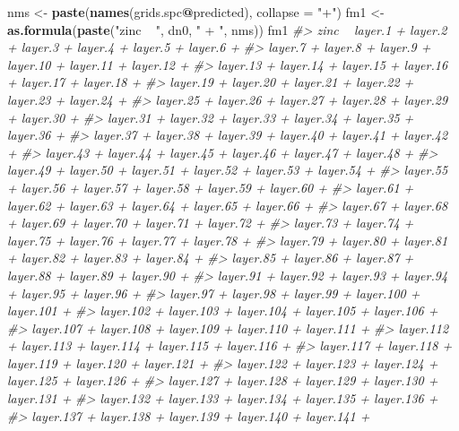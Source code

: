 \documentclass[graybox,natbib,nospthms,UStrade]{svmono}
\newenvironment{Shaded}{\begin{snugshade}}{\end{snugshade}}
\newcommand{\CommentTok}[1]{\textcolor[rgb]{0.37,0.37,0.37}{\textit{#1}}}
\newcommand{\DataTypeTok}[1]{\textcolor[rgb]{0.27,0.27,0.27}{#1}}
\newcommand{\KeywordTok}[1]{\textcolor[rgb]{0.27,0.27,0.27}{\textbf{#1}}}
\newcommand{\NormalTok}[1]{#1}
\newcommand{\OperatorTok}[1]{\textcolor[rgb]{0.43,0.43,0.43}{\textbf{#1}}}
\newcommand{\StringTok}[1]{\textcolor[rgb]{0.5,0.5,0.5}{#1}}
\begin{document}
\begin{Shaded}
\begin{Highlighting}[]
\NormalTok{nms <-}\StringTok{ }\KeywordTok{paste}\NormalTok{(}\KeywordTok{names}\NormalTok{(grids.spc}\OperatorTok{@}\NormalTok{predicted), }\DataTypeTok{collapse =} \StringTok{"+"}\NormalTok{)}
\NormalTok{fm1 <-}\StringTok{ }\KeywordTok{as.formula}\NormalTok{(}\KeywordTok{paste}\NormalTok{(}\StringTok{"zinc ~ "}\NormalTok{, dn0, }\StringTok{" + "}\NormalTok{, nms))}
\NormalTok{fm1}
\CommentTok{#> zinc ~ layer.1 + layer.2 + layer.3 + layer.4 + layer.5 + layer.6 + }
\CommentTok{#>     layer.7 + layer.8 + layer.9 + layer.10 + layer.11 + layer.12 + }
\CommentTok{#>     layer.13 + layer.14 + layer.15 + layer.16 + layer.17 + layer.18 + }
\CommentTok{#>     layer.19 + layer.20 + layer.21 + layer.22 + layer.23 + layer.24 + }
\CommentTok{#>     layer.25 + layer.26 + layer.27 + layer.28 + layer.29 + layer.30 + }
\CommentTok{#>     layer.31 + layer.32 + layer.33 + layer.34 + layer.35 + layer.36 + }
\CommentTok{#>     layer.37 + layer.38 + layer.39 + layer.40 + layer.41 + layer.42 + }
\CommentTok{#>     layer.43 + layer.44 + layer.45 + layer.46 + layer.47 + layer.48 + }
\CommentTok{#>     layer.49 + layer.50 + layer.51 + layer.52 + layer.53 + layer.54 + }
\CommentTok{#>     layer.55 + layer.56 + layer.57 + layer.58 + layer.59 + layer.60 + }
\CommentTok{#>     layer.61 + layer.62 + layer.63 + layer.64 + layer.65 + layer.66 + }
\CommentTok{#>     layer.67 + layer.68 + layer.69 + layer.70 + layer.71 + layer.72 + }
\CommentTok{#>     layer.73 + layer.74 + layer.75 + layer.76 + layer.77 + layer.78 + }
\CommentTok{#>     layer.79 + layer.80 + layer.81 + layer.82 + layer.83 + layer.84 + }
\CommentTok{#>     layer.85 + layer.86 + layer.87 + layer.88 + layer.89 + layer.90 + }
\CommentTok{#>     layer.91 + layer.92 + layer.93 + layer.94 + layer.95 + layer.96 + }
\CommentTok{#>     layer.97 + layer.98 + layer.99 + layer.100 + layer.101 + }
\CommentTok{#>     layer.102 + layer.103 + layer.104 + layer.105 + layer.106 + }
\CommentTok{#>     layer.107 + layer.108 + layer.109 + layer.110 + layer.111 + }
\CommentTok{#>     layer.112 + layer.113 + layer.114 + layer.115 + layer.116 + }
\CommentTok{#>     layer.117 + layer.118 + layer.119 + layer.120 + layer.121 + }
\CommentTok{#>     layer.122 + layer.123 + layer.124 + layer.125 + layer.126 + }
\CommentTok{#>     layer.127 + layer.128 + layer.129 + layer.130 + layer.131 + }
\CommentTok{#>     layer.132 + layer.133 + layer.134 + layer.135 + layer.136 + }
\CommentTok{#>     layer.137 + layer.138 + layer.139 + layer.140 + layer.141 + }

\end{Highlighting}
\end{Shaded}
\end{document}
